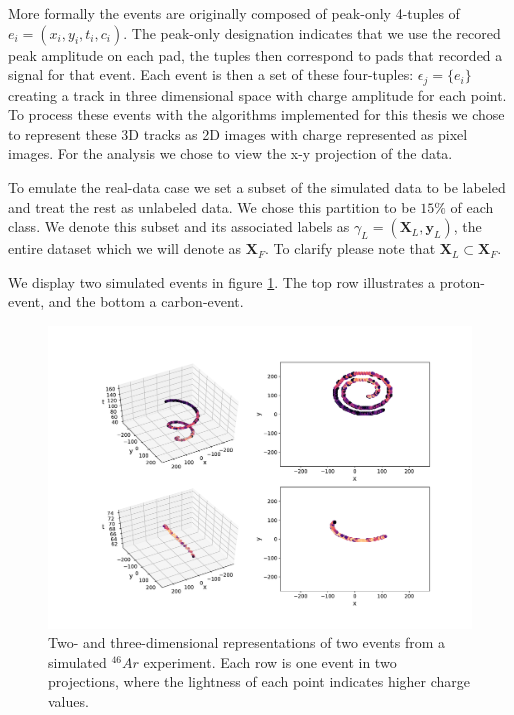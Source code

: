 More formally the events are originally composed of peak-only 4-tuples of $e_i = (x_i, y_i, t_i, c_i)$. The peak-only designation indicates that we use the recored peak amplitude on each pad, the tuples then correspond to pads that recorded a signal for that event. Each event is then a set of these four-tuples: $\epsilon_j = \{e_i\}$ creating a track in three dimensional space with charge amplitude for each point. To process these events with the algorithms implemented for this thesis we chose to represent these 3D tracks as 2D images with charge represented as pixel images. For the analysis we chose to view the x-y projection of the data.

To emulate the real-data case we set a subset of the simulated data to be labeled and treat the rest as unlabeled data. We chose this partition to be $15\%$ of each class. We denote this subset and its associated labels as $\gamma_L=(\mathbf{X}_L, \mathbf{y}_L)$, the entire dataset which we will denote as $\mathbf{X}_F$. To clarify please note that $\mathbf{X}_L \subset \mathbf{X}_F$.

We display two simulated events in figure \ref{fig:sim_samples}. The top row illustrates a proton-event, and the bottom a carbon-event. 

\begin{figure}[H]
\centering
\includegraphics[width=\textwidth]{../plots/display_eventssimulated.pdf}
\caption[Displaying simulated events in 2D and 3D]{Two- and three-dimensional representations of two events from a simulated ${}^{46}Ar$ experiment. Each row is one event in two projections, where the lightness of each point indicates higher charge values.}\label{fig:sim_samples}
\end{figure}


